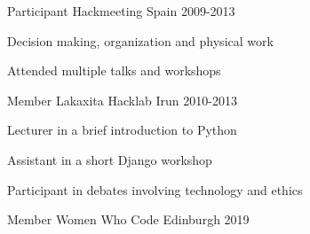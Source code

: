 \documentclass[11pt, a4paper]{awesome-cv}
\begin{document}
\begin{cventries}
    \cventry
      {Participant} %
      {Hackmeeting} %
      {Spain} %
      {2009-2013} %
      {
        \begin{cvitems} %
          \item {Decision making, organization and physical work}
          \item {Attended multiple talks and workshops}
        \end{cvitems}
      }
  
    \cventry
      {Member} %
      {Lakaxita Hacklab} %
      {Irun} %
      {2010-2013} %
      {
        \begin{cvitems} %
          \item {Lecturer in a brief introduction to Python}
          \item {Assistant in a short Django workshop}
          \item {Participant in debates involving technology and ethics}
        \end{cvitems}
      }
\end{cventries}


\begin{cventries}
    \cventry
      {Member} %
      {Women Who Code} %
      {Edinburgh} %
      {2019} %
      {}
\end{cventries}
\end{document}
